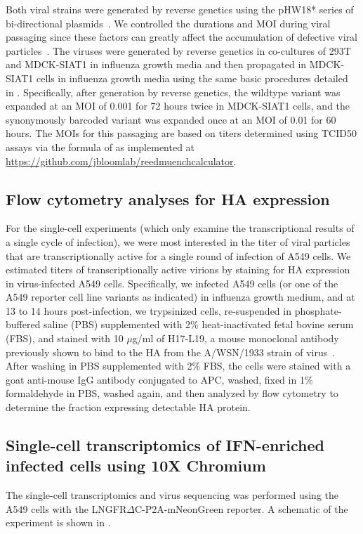 \documentclass[9pt,lineno]{elife}
\begin{document}
Both viral strains were generated by reverse genetics using the pHW18* series of bi-directional plasmids~\citep{hoffmann2000dna}.
We controlled the durations and MOI during viral passaging since these factors can greatly affect the accumulation of defective viral particles~\citep{xue2016propagation}.
The viruses were generated by reverse genetics in co-cultures of 293T and MDCK-SIAT1 in influenza growth media and then propagated in MDCK-SIAT1 cells in influenza growth media using the same basic procedures detailed in \citet{russell2018extreme}.
Specifically, after generation by reverse genetics, the wildtype variant was expanded at an MOI of 0.001 for 72 hours twice in MDCK-SIAT1 cells, and the synonymously barcoded variant was expanded once at an MOI of 0.01 for 60 hours.
The MOIs for this passaging are based on titers determined using TCID50 assays via the formula of \citet{reed1938simple} as implemented at \url{https://github.com/jbloomlab/reedmuenchcalculator}.

\subsection{Flow cytometry analyses for HA expression}
For the single-cell experiments (which only examine the transcriptional results of a single cycle of infection), we were most interested in the titer of viral particles that are transcriptionally active for a single round of infection of A549 cells.
We estimated titers of transcriptionally active virions by staining for HA expression in virus-infected A549 cells.
Specifically, we infected A549 cells (or one of the A549 reporter cell line variants as indicated) in influenza growth medium, and at 13 to 14 hours post-infection, we trypsinized cells, re-suspended in phosphate-buffered saline (PBS) supplemented with 2\% heat-inactivated fetal bovine serum (FBS), and stained with 10 $\mu$g/ml of H17-L19, a mouse monoclonal antibody previously shown to bind to the HA from the A/WSN/1933 strain of virus~\citep{doud2017complete}.
After washing in PBS supplemented with 2\% FBS, the cells were stained with a goat anti-mouse IgG antibody conjugated to APC, washed, fixed in 1\% formaldehyde in PBS, washed again, and then analyzed by flow cytometry to determine the fraction expressing detectable HA protein.

\subsection{Single-cell transcriptomics of IFN-enriched infected cells using 10X Chromium}
The single-cell transcriptomics and virus sequencing was performed using the A549 cells with the LNGFR$\Delta$C-P2A-mNeonGreen reporter.
A schematic of the experiment is shown in .
\end{document}

